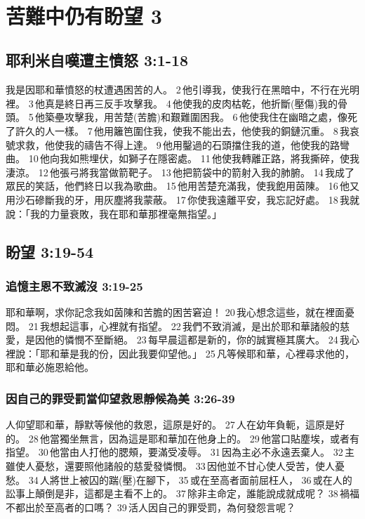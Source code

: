  
\section{苦難中仍有盼望 3}
\subsection{耶利米自嘆遭主憤怒 3:1-18}
我是因耶和華憤怒的杖遭遇困苦的人。 2 他引導我，使我行在黑暗中，不行在光明裡。 3 他真是終日再三反手攻擊我。 4 他使我的皮肉枯乾，他折斷(壓傷)我的骨頭。 5 他築壘攻擊我，用苦楚(苦膽)和艱難圍困我。 6 他使我住在幽暗之處，像死了許久的人一樣。 7 他用籬笆圍住我，使我不能出去，他使我的銅鏈沉重。 8 我哀號求救，他使我的禱告不得上達。 9 他用鑿過的石頭擋住我的道，他使我的路彎曲。 10 他向我如熊埋伏，如獅子在隱密處。 11 他使我轉離正路，將我撕碎，使我淒涼。 12 他張弓將我當做箭靶子。 13 他把箭袋中的箭射入我的肺腑。 14 我成了眾民的笑話，他們終日以我為歌曲。 15 他用苦楚充滿我，使我飽用茵陳。 16 他又用沙石磣斷我的牙，用灰塵將我蒙蔽。 17 你使我遠離平安，我忘記好處。 18 我就說：「我的力量衰敗，我在耶和華那裡毫無指望。」

\subsection{盼望 3:19-54}
\subsubsection{追憶主恩不致滅沒 3:19-25}
耶和華啊，求你記念我如茵陳和苦膽的困苦窘迫！ 20 我心想念這些，就在裡面憂悶。 21 我想起這事，心裡就有指望。 22 我們不致消滅，是出於耶和華諸般的慈愛，是因他的憐憫不至斷絕。 23 每早晨這都是新的，你的誠實極其廣大。 24 我心裡說：「耶和華是我的份，因此我要仰望他。」 25 凡等候耶和華，心裡尋求他的，耶和華必施恩給他。

\subsubsection{因自己的罪受罰當仰望救恩靜候為美 3:26-39}
人仰望耶和華，靜默等候他的救恩，這原是好的。 27 人在幼年負軛，這原是好的。 28 他當獨坐無言，因為這是耶和華加在他身上的。 29 他當口貼塵埃，或者有指望。 30 他當由人打他的腮頰，要滿受凌辱。 31 因為主必不永遠丟棄人。 32 主雖使人憂愁，還要照他諸般的慈愛發憐憫。 33 因他並不甘心使人受苦，使人憂愁。 34 人將世上被囚的踹(壓)在腳下， 35 或在至高者面前屈枉人， 36 或在人的訟事上顛倒是非，這都是主看不上的。 37 除非主命定，誰能說成就成呢？ 38 禍福不都出於至高者的口嗎？ 39 活人因自己的罪受罰，為何發怨言呢？

